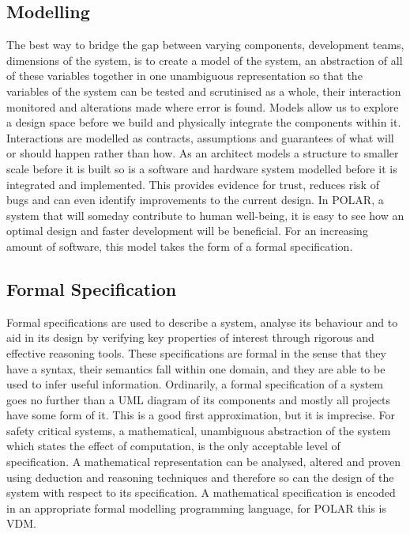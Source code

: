 \subsection{Modelling}
The best way to bridge the gap between varying components, development teams, dimensions of the system, is to create a model of the system, an abstraction of all of these variables together in one unambiguous representation so that the variables of the system can be tested and scrutinised as a whole, their interaction monitored and alterations made where error is found. Models allow us to explore a design space before we build and physically integrate the components within it. Interactions are modelled as contracts, assumptions and guarantees of what will or should happen rather than how. As an architect models a structure to smaller scale before it is built so is a software and hardware system modelled before it is integrated and implemented. This provides evidence for trust, reduces risk of bugs and can even identify improvements to the current design. In POLAR, a system that will someday contribute to human well-being, it is easy to see how an optimal design and faster development will be beneficial. For an increasing amount of software, this model takes the form of a formal specification.

\subsection{Formal Specification}
Formal specifications are used to describe a system, analyse its behaviour and to aid in its design by verifying key properties of interest through rigorous and effective reasoning tools\parencite{FORMAL1}\parencite{FORMAL2}. These specifications are formal in the sense that they have a syntax, their semantics fall within one domain, and they are able to be used to infer useful information\parencite{Lamsweerde2000}.\parencite{wikiFS} Ordinarily, a formal specification of a system goes no further than a UML diagram of its components and mostly all projects have some form of it. This is a good first approximation, but it is imprecise. For safety critical systems, a mathematical, unambiguous abstraction of the system which states the effect of computation, is the only acceptable level of specification. A mathematical representation can be analysed, altered and proven using deduction and reasoning techniques and therefore so can the design of the system with respect to its specification. A mathematical specification is encoded in an appropriate formal modelling programming language, for POLAR this is VDM.


